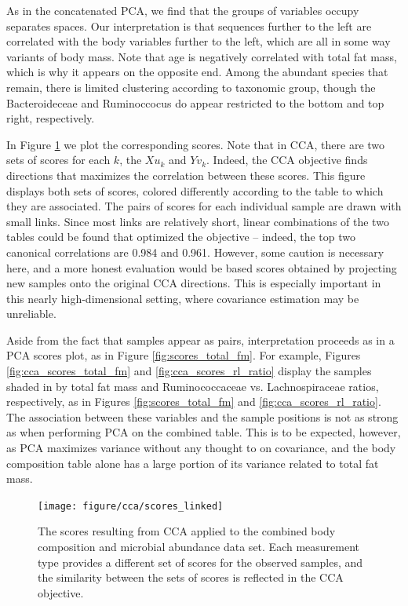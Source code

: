 \documentclass[14pt]{extarticle}
\begin{document}
As in the concatenated PCA, we find that the groups of variables occupy
separates spaces. Our interpretation is that sequences further to the left are
correlated with the body variables further to the left, which are all in some
way variants of body mass. Note that age is negatively correlated with total fat
mass, which is why it appears on the opposite end. Among the abundant species
that remain, there is limited clustering according to taxonomic group, though
the Bacteroideceae and Ruminoccocus do appear restricted to the bottom and top
right, respectively.

In Figure \ref{fig:cca_scores_linked} we plot the corresponding scores. Note
that in CCA, there are two sets of scores for each $k$, the $Xu_{k}$ and
$Yv_{k}$. Indeed, the CCA objective finds directions that maximizes the
correlation between these scores. This figure displays both sets of scores,
colored differently according to the table to which they are associated. The
pairs of scores for each individual sample are drawn with small links. Since
most links are relatively short, linear combinations of the two tables could be
found that optimized the objective -- indeed, the top two canonical correlations
are 0.984 and 0.961. However, some caution is necessary here, and a more honest
evaluation would be based scores obtained by projecting new samples onto the
original CCA directions. This is especially important in this nearly
high-dimensional setting, where covariance estimation may be unreliable.

Aside from the fact that samples appear as pairs, interpretation proceeds as in
a PCA scores plot, as in Figure \ref{fig:scores_total_fm}. For example, Figures
\ref{fig:cca_scores_total_fm} and \ref{fig:cca_scores_rl_ratio} display the
samples shaded in by total fat mass and Ruminococcaceae vs. Lachnospiraceae
ratios, respectively, as in Figures \ref{fig:scores_total_fm} and
\ref{fig:cca_scores_rl_ratio}. The association between these variables and the
sample positions is not as strong as when performing PCA on the combined table.
This is to be expected, however, as PCA maximizes variance without any thought
to on covariance, and the body composition table alone has a large portion of
its variance related to total fat mass.

\begin{figure}
  \centering
  \texttt{[image: figure/cca/scores\_linked]}
  \caption{The scores resulting from CCA applied to the combined body
    composition and microbial abundance data set. Each measurement type provides
    a different set of scores for the observed samples, and the similarity
    between the sets of scores is reflected in the CCA
    objective.\label{fig:cca_scores_linked}}
\end{figure}
\end{document}
